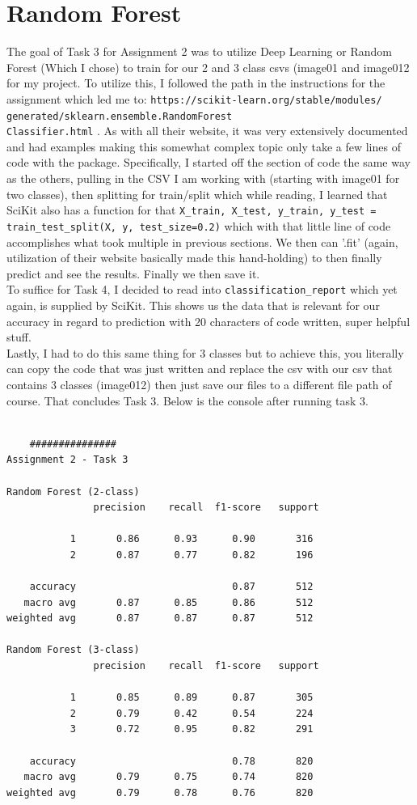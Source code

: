 \documentclass[conference]{IEEEtran} %
\begin{document}
\section{Random Forest}
The goal of Task 3 for Assignment 2 was to utilize Deep Learning or Random Forest (Which I chose) to train for our 2 and 3 class csvs (image01 and image012 for my project.  To utilize this, I followed the path in the instructions for the assignment which led me to: \texttt{https://scikit-learn.org/stable/modules/\\generated/sklearn.ensemble.RandomForest\\Classifier.html}
.  As with all their website, it was very extensively documented and had examples making this somewhat complex topic only take a few lines of code with the package. Specifically, I started off the section of code the same way as the others, pulling in the CSV I am working with (starting with image01 for two classes), then splitting for train/split which while reading, I learned that SciKit also has a function for that \texttt{X\_train, X\_test, y\_train, y\_test = train\_test\_split(X, y, test\_size=0.2)}
 which with that little line of code accomplishes what took multiple in previous sections.  We then can '.fit' (again, utilization of their website basically made this hand-holding) to then finally predict and see the results.  Finally we then save it.  \\ To suffice for Task 4, I decided to read into \texttt{classification\_report} which yet again, is supplied by SciKit.  This shows us the data that is relevant for our accuracy in regard to prediction with 20 characters of code written, super helpful stuff.  \\ Lastly, I had to do this same thing for 3 classes but to achieve this, you literally can copy the code that was just written and replace the csv with our csv that contains 3 classes (image012) then just save our files to a different file path of course.  That concludes Task 3.  Below is the console after running task 3.
\begin{lstlisting}

    ###############
Assignment 2 - Task 3

Random Forest (2-class) 
               precision    recall  f1-score   support

           1       0.86      0.93      0.90       316
           2       0.87      0.77      0.82       196

    accuracy                           0.87       512
   macro avg       0.87      0.85      0.86       512
weighted avg       0.87      0.87      0.87       512

Random Forest (3-class) 
               precision    recall  f1-score   support

           1       0.85      0.89      0.87       305
           2       0.79      0.42      0.54       224
           3       0.72      0.95      0.82       291

    accuracy                           0.78       820
   macro avg       0.79      0.75      0.74       820
weighted avg       0.79      0.78      0.76       820

\end{lstlisting}
\end{document}

